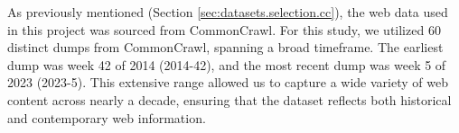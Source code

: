 





As previously mentioned (Section \ref{sec:datasets.selection.cc}), the web data used in this project was sourced from CommonCrawl. For this study, we utilized 60 distinct dumps from CommonCrawl, spanning a broad timeframe. The earliest dump was week 42 of 2014 (2014-42), and the most recent dump was week 5 of 2023 (2023-5). This extensive range allowed us to capture a wide variety of web content across nearly a decade, ensuring that the dataset reflects both historical and contemporary web information.

